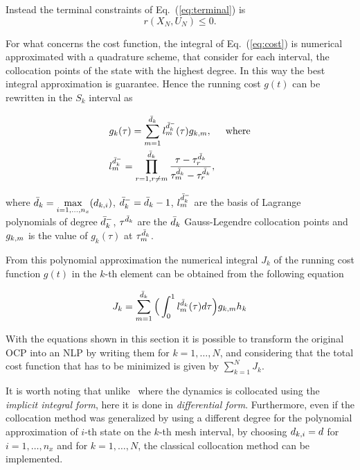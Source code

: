 Instead the terminal constraints of Eq.~(\ref{eq:terminal}) is
\begin{equation}\label{eq:npterminal}
	r(X_N, U_N) \leq 0.
\end{equation}

For what concerns the cost function, the integral of Eq.~(\ref{eq:cost}) is numerical approximated with a quadrature scheme, that consider for each interval, the collocation points of the state with the highest degree. In this way the best integral approximation is guarantee. Hence the running cost $g(t)$ can be rewritten in the $S_k$ interval as

\begin{subequations}
	\begin{align}
	& g_k(\tau) = \sum_{m=1}^{\bar{d}_k} l_{m}^{\bar{d}_{k}^{-}}(\tau)g_{k,m}, \hspace{5mm} \text{where}\\
	&  l_{m}^{\bar{d}_{k}^{-}} = \prod_{r=1, r\neq m}^{\bar{d}_k} \dfrac{\tau - \tau^{\bar{d}_{k}}_{r}}{\tau^{\bar{d}_{k}}_{m} - \tau^{\bar{d}_{k}}_{r}},
	\end{align}
\end{subequations}

where $\bar{d}_k = \max\limits_{i= 1, \dots, n_x}(d_{k,i})$, $\bar{d}_k^{-} = \bar{d}_k -1$, $l_{m}^{\bar{d}_{k}^{-}}$ are the basis of Lagrange polynomials of degree $\bar{d}_k^{-}$, $\tau^{\bar{d}_{k}}$ are the $\bar{d}_k$ Gauss-Legendre collocation points and $g_{k,m}$ is the value of $g_k (\tau)$ at $\tau^{\bar{d}_{k}}_{m}$.

From this polynomial approximation the numerical integral $J_k$ of the running cost function $g(t)$ in the $k$-th element can be obtained from the following equation

\begin{equation}
	J_k = \sum_{m=1}^{\bar{d}_k}\Big(\int_{0}^{1}l_{m}^{\bar{d}_{k}}(\tau)d\tau\Big)g_{k,m} h_{k}
\end{equation}

With the equations shown in this section it is possible to transform the original OCP into an NLP by writing them for $k = 1, \dots, N$, and considering that the total cost function that has to be minimized is given by $\sum_{k=1}^{N}J_k$.

It is worth noting that unlike~\cite{Patterson:OCAM:2015} where the dynamics is collocated using the \emph{implicit integral form}, here it is done in \emph{differential form}.
Furthermore, even if the collocation method was generalized by using a different degree for the polynomial approximation of $i$-th state on the $k$-th mesh interval, by choosing $d_{k,i} = d$ for $i = 1, \dots, n_x$ and for $k = 1, \dots, N$, the classical collocation method can be implemented.
